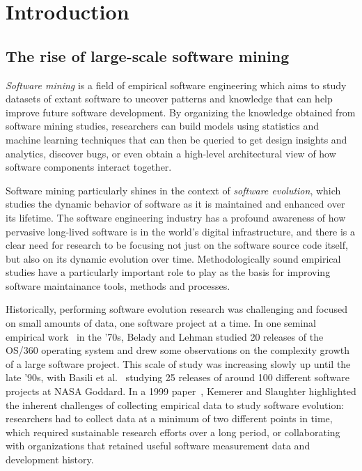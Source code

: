 \chapter{Introduction}

\section{The rise of large-scale software mining}

\emph{Software mining} is a field of empirical software engineering which aims
to study datasets of extant software to uncover patterns and knowledge that can
help improve future software development. By organizing the knowledge obtained
from software mining studies, researchers can build models using statistics and
machine learning techniques that can then be queried to get design insights and
analytics, discover bugs, or even obtain a high-level architectural view of
how software components interact together.

Software mining particularly shines in the context of \emph{software
evolution}, which studies the dynamic behavior of software as it is maintained
and enhanced over its lifetime. The software engineering industry has a
profound awareness of how pervasive long-lived software is in the world's
digital infrastructure, and there is a clear need for research to be focusing
not just on the software source code itself, but also on its dynamic evolution
over time. Methodologically sound empirical studies have a particularly
important role to play as the basis for improving software maintainance tools,
methods and processes.

Historically, performing software evolution research was challenging and
focused on small amounts of data, one software project at a time. In one
seminal empirical work~\cite{belady1976model} in the '70s, Belady and Lehman
studied 20 releases of the OS/360 operating system and drew some observations
on the complexity growth of a large software project. This scale of study was
increasing slowly up until the late '90s, with Basili et
al.~\cite{basili1996understanding} studying 25 releases of around 100 different
software projects at NASA Goddard.  In a 1999
paper~\cite{kemerer1999empirical}, Kemerer and Slaughter highlighted the
inherent challenges of collecting empirical data to study software evolution:
researchers had to collect data at a minimum of two different points in time,
which required sustainable research efforts over a long period, or
collaborating with organizations that retained useful software measurement data
and development history.

